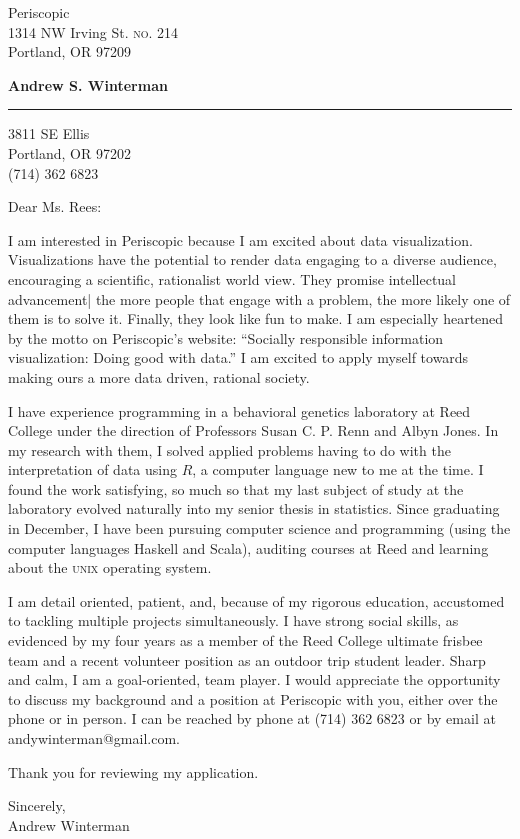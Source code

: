 \documentclass[11pt]{letter} %
\begin{document}
\longindentation=0pt                       %
\let\raggedleft\raggedright                %
\begin{letter}{Periscopic \\
1314 NW Irving St. \textsc{no}. 214 \\
Portland, OR 97209\\ 
}
\begin{center}
\large \bf{Andrew S. Winterman} 
\end{center}
\medskip\hrule height 1pt
\begin{center}
3811 SE Ellis \\ Portland, OR 97202 \\ (714) 362 6823
\end{center}  
\opening{Dear Ms. Rees:} 

I am interested in Periscopic because I am excited about data
visualization. Visualizations have the potential to render data
engaging to a diverse audience, encouraging a scientific,
rationalist world view. They promise intellectual
advancement| the more people that engage with a problem, the more
likely one of them is to solve it. Finally, they look like fun to make. I am especially heartened by the
motto on Periscopic's website: ``Socially responsible information
visualization: Doing good with data.''  I am excited to apply myself
towards making ours a more data driven, rational society.

I have experience programming in a behavioral genetics laboratory at
Reed College under the direction of Professors Susan C. P. Renn and
Albyn Jones. In my research with them, I solved applied problems
having to do with the interpretation of data using $R$, a computer
language new to me at the time. I found the work satisfying, so much
so that my last subject of study at the laboratory evolved naturally
into my senior thesis in statistics. Since graduating in December, I
have been pursuing computer science and programming (using  the
computer languages Haskell and Scala), auditing courses at Reed and learning
about the \textsc{unix} operating system.
 
I am detail oriented, patient, and, because of my rigorous education,
accustomed to tackling multiple projects simultaneously. I have strong
social skills, as evidenced by my four years as a member of the Reed
College ultimate frisbee team and a recent volunteer position as an
outdoor trip student leader. Sharp and calm, I am a goal-oriented, team
player. I would appreciate the opportunity to discuss my
background and a position at Periscopic  with you, either over the phone or in
person. I can be reached by phone at (714) 362 6823 or by email at
andywinterman@gmail.com.

Thank you for reviewing my application.

Sincerely, \\
Andrew Winterman
\end{letter}
 
\end{document}
